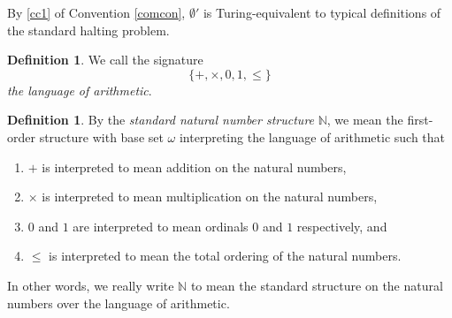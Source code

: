 \documentclass[12pt, twoside]{memoir}
\numberwithin{equation}{section}
\theoremstyle{definition}
\newtheorem{defi}[thm]{Definition}
\theoremstyle{remark}
\theoremstyle{definition}
\theoremstyle{definition}
\theoremstyle{definition}
\theoremstyle{remark}
\begin{document}
By \ref{cc1} of Convention \ref{comcon}, $\emptyset'$ is Turing-equivalent to typical definitions of the standard halting problem.

\begin{defi}
We call the signature $$\{+, \times, 0, 1, \leq\}$$ \emph{the language of arithmetic}. 
\end{defi}

\begin{defi}
By the \emph{standard natural number structure} $\mathbb{N}$, we mean the first-order structure with base set $\omega$ interpreting the language of arithmetic such that
\begin{enumerate}[label=(\alph*)]
    \item $+$ is interpreted to mean addition on the natural numbers,
    \item $\times$ is interpreted to mean multiplication on the natural numbers,
    \item $0$ and $1$ are interpreted to mean ordinals $0$ and $1$ respectively, and
    \item $\leq$ is interpreted to mean the total ordering of the natural numbers.
\end{enumerate} 
In other words, we really write $\mathbb{N}$ to mean the standard structure on the natural numbers over the language of arithmetic.
\end{defi}
\end{document}
